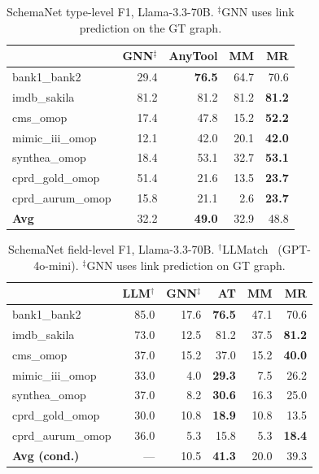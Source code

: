 \documentclass[sigconf, nonacm]{acmart}
\begin{document}
\begin{table}[htbp]
\centering
\small
\setlength{\tabcolsep}{4pt}
\caption{SchemaNet type-level F1, Llama-3.3-70B. $^\ddagger$GNN uses link prediction on the GT graph.}
\label{tab:schemanet_type}
\begin{tabular}{l rrrr}
\toprule
& \textbf{GNN}$^\ddagger$ & \textbf{AnyTool} & \textbf{MM} & \textbf{MR} \\
\midrule
bank1\_bank2      & 29.4 & \textbf{76.5} & 64.7 & 70.6 \\
imdb\_sakila      & 81.2 & 81.2 & 81.2 & \textbf{81.2} \\
cms\_omop         & 17.4 & 47.8 & 15.2 & \textbf{52.2} \\
mimic\_iii\_omop  & 12.1 & 42.0 & 20.1 & \textbf{42.0} \\
synthea\_omop     & 18.4 & 53.1 & 32.7 & \textbf{53.1} \\
cprd\_gold\_omop  & 51.4 & 21.6 & 13.5 & \textbf{23.7} \\
cprd\_aurum\_omop & 15.8 & 21.1 &  2.6 & \textbf{23.7} \\
\midrule
\textbf{Avg}      & 32.2 & \textbf{49.0} & 32.9 & 48.8 \\
\bottomrule
\end{tabular}
\end{table}

\begin{table}[htbp]
\centering
\small
\setlength{\tabcolsep}{4pt}
\caption{SchemaNet field-level F1, Llama-3.3-70B. $^\dagger$LLMatch~\protect\cite{wang2025llmatch} (GPT-4o-mini). $^\ddagger$GNN uses link prediction on GT graph.}
\label{tab:schemanet}
\begin{tabular}{l rrrrr}
\toprule
& \textbf{LLM}$^\dagger$ & \textbf{GNN}$^\ddagger$ & \textbf{AT} & \textbf{MM} & \textbf{MR} \\
\midrule
bank1\_bank2      & 85.0 & 17.6 & \textbf{76.5} & 47.1 & 70.6 \\
imdb\_sakila      & 73.0 & 12.5 & 81.2 & 37.5 & \textbf{81.2} \\
cms\_omop         & 37.0 & 15.2 & 37.0 & 15.2 & \textbf{40.0} \\
mimic\_iii\_omop  & 33.0 &  4.0 & \textbf{29.3} &  7.5 & 26.2 \\
synthea\_omop     & 37.0 &  8.2 & \textbf{30.6} & 16.3 & 25.0 \\
cprd\_gold\_omop  & 30.0 & 10.8 & \textbf{18.9} & 10.8 & 13.5 \\
cprd\_aurum\_omop & 36.0 &  5.3 & 15.8 &  5.3 & \textbf{18.4} \\
\midrule
\textbf{Avg (cond.)} & --- & 10.5 & \textbf{41.3} & 20.0 & 39.3 \\
\bottomrule
\end{tabular}
\end{table}
\end{document}
